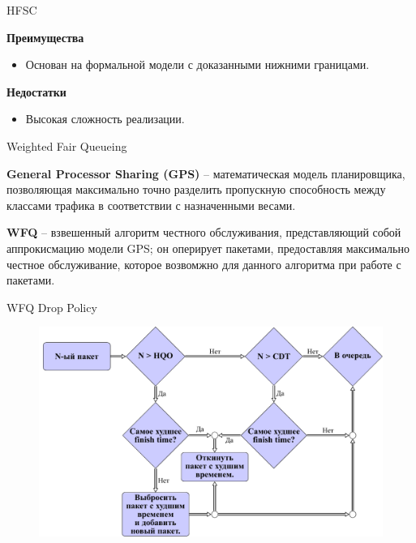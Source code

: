\documentclass[12pt]{beamer}
\begin{document}
\begin{frame}{HFSC}
	\begin{center}
    {\footnotesize
            \begin{multicols}{2}
				{\bf Преимущества}
				\begin{itemize}
					\item Основан на формальной модели с доказанными нижними границами.
				\end{itemize}
            \columnbreak
				{\bf Недостатки}
				\begin{itemize}
					\item Высокая сложность реализации.
				\end{itemize}
            \end{multicols}
        }
	\end{center}
\end{frame}

\begin{frame}{Weighted Fair Queueing}
	

	\textbf{General Processor Sharing (GPS)} -- математическая модель
	планировщика, позволяющая максимально точно разделить пропускную
	способность между классами трафика в соответствии с назначенными
	весами.

	\textbf{WFQ} -- взвешенный алгоритм честного обслуживания,
	представляющий собой аппрокисмацию модели GPS; он оперирует
	пакетами, предоставляя максимально честное обслуживание,
	которое возвомжно для данного алгоритма при работе с пакетами.

\end{frame}

\begin{frame}{WFQ Drop Policy}
	\begin{figure}
		\center
    	\includegraphics[scale=0.6]{../text/src/pdfimages/fwfq_drop.pdf}
	\end{figure}
\end{frame}
\end{document}
